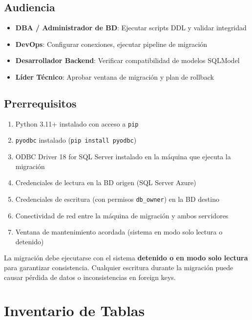 \documentclass[12pt,a4paper,twoside]{report}
\begin{document}
\section{Audiencia}

\begin{itemize}[noitemsep]
    \item \textbf{DBA / Administrador de BD}: Ejecutar scripts DDL y validar integridad
    \item \textbf{DevOps}: Configurar conexiones, ejecutar pipeline de migraci\'on
    \item \textbf{Desarrollador Backend}: Verificar compatibilidad de modelos SQLModel
    \item \textbf{L\'ider T\'ecnico}: Aprobar ventana de migraci\'on y plan de rollback
\end{itemize}

\section{Prerrequisitos}

\begin{enumerate}[noitemsep]
    \item Python 3.11+ instalado con acceso a \texttt{pip}
    \item \texttt{pyodbc} instalado (\texttt{pip install pyodbc})
    \item ODBC Driver 18 for SQL Server instalado en la m\'aquina que ejecuta la migraci\'on
    \item Credenciales de lectura en la BD origen (SQL Server Azure)
    \item Credenciales de escritura (con permisos \texttt{db\_owner}) en la BD destino
    \item Conectividad de red entre la m\'aquina de migraci\'on y ambos servidores
    \item Ventana de mantenimiento acordada (sistema en modo solo lectura o detenido)
\end{enumerate}

\begin{warningbox}
La migraci\'on debe ejecutarse con el sistema \textbf{detenido o en modo solo lectura} para garantizar consistencia. Cualquier escritura durante la migraci\'on puede causar p\'erdida de datos o inconsistencias en foreign keys.
\end{warningbox}

\chapter{Inventario de Tablas}
\end{document}
